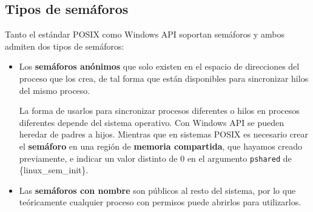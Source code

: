 \subsection{Tipos de semáforos}\label{_tipos_de_semuxe1foros}

Tanto el estándar POSIX como Windows API soportan semáforos y ambos
admiten dos tipos de semáforos:

\begin{itemize}
\item
  Los \textbf{semáforos anónimos}{} que solo existen en el espacio de
  direcciones del proceso que los crea, de tal forma que están
  disponibles para sincronizar hilos del mismo proceso.

  La forma de usarlos para sincronizar procesos diferentes o hilos en
  procesos diferentes depende del sistema operativo. Con Windows API se
  pueden heredar de padres a hijos. Mientras que en sistemas POSIX es
  necesario crear el \textbf{semáforo} en una región de \textbf{memoria
  compartida}, que hayamos creado previamente, e indicar un valor
  distinto de 0 en el argumento \texttt{pshared} de
  \{linux\_sem\_init\}.
\item
  Las \textbf{semáforos con nombre}{} son públicos al resto del sistema,
  por lo que teóricamente cualquier proceso con permisos puede abrirlos
  para utilizarlos.
\end{itemize}

